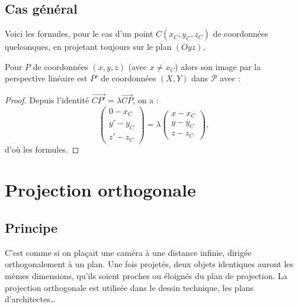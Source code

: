 \documentclass[11pt,class=report,crop=false]{standalone}
\begin{document}
\subsection{Cas général}

Voici les formules, pour le cas d'un point $C(x_C,y_C,z_C)$ de coordonnées quelconques, en projetant toujours sur le plan $(Oyz)$, 
\begin{proposition}
Pour $P$ de coordonnées $(x,y,z)$ (avec $x \neq x_C$) alors son image par la perspective linéaire est $P'$ de coordonnées $(X,Y)$ dans $\mathcal{P}$ avec :
\end{proposition}

\begin{proof}
Depuis l'identité $\overrightarrow{CP'} = \lambda \overrightarrow{CP}$, on a :
$$
\begin{pmatrix}0-x_C\\y'-y_C\\z'-z_C\end{pmatrix}
= \lambda 
\begin{pmatrix}x-x_C\\y-y_C\\z-z_C\end{pmatrix},$$
d'où les formules.
\end{proof}


\section{Projection orthogonale}


\subsection{Principe}

C'est comme si on plaçait une caméra à une distance infinie, dirigée orthogonalement à un plan.
Une fois projetés, deux objets identiques auront les mêmes dimensions, qu'ils soient proches ou éloignés du plan de projection.
La projection orthogonale est utilisée  dans le dessin technique, les plans d'architectes\ldots
\end{document}
